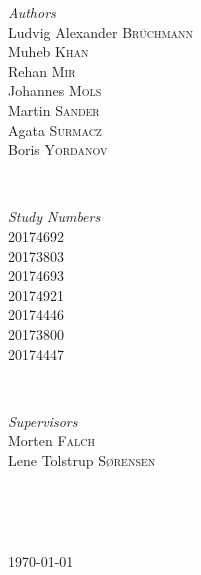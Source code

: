\documentclass[12p]{article}
\begin{document}
\begin{titlepage}
	\begin{minipage}{0.4\textwidth}
  \begin{flushleft} \large
  \emph{Authors}\\
    Ludvig Alexander \textsc{Brüchmann} \\
    Muheb \textsc{Khan} \\
  	Rehan \textsc{Mir} \\
  	Johannes \textsc{Mols} \\
  	Martin \textsc{Sander} \\
  	Agata \textsc{Surmacz} \\
  	Boris \textsc{Yordanov} \\
  \end{flushleft}
  \end{minipage}
  ~
  \begin{minipage}{0.4\textwidth}
  \begin{flushright} \large
  \emph{Study Numbers} \\
    20174692 \\
    20173803 \\
    20174693 \\
    20174921 \\
    20174446 \\
    20173800 \\
    20174447 \\
  \end{flushright}
  \end{minipage}\\[0.5cm]
  
  
  \begin{minipage}{0.4\textwidth}
  \begin{flushleft} \large
  \emph{Supervisors}\\
    Morten \textsc{Falch} \\
    Lene Tolstrup \textsc{Sørensen} \\
  \end{flushleft}
  \end{minipage}
  ~
  \begin{minipage}{0.4\textwidth}
  \begin{flushright} \large
  \end{flushright}
  \end{minipage}\\[0.5cm]

	
	\vfill\vfill\vfill %
	
	{\large\today} %
	
  
\end{titlepage}
\end{document}
